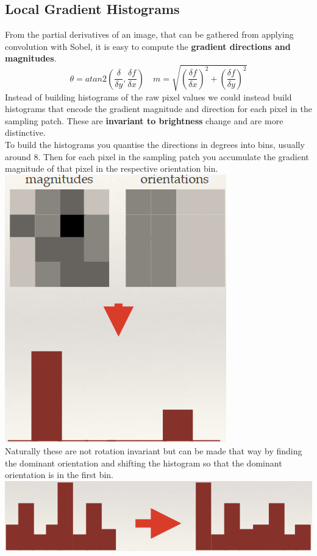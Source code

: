 \documentclass{article}
\begin{document}
	\subsection{Local Gradient Histograms}
	From the partial derivatives of an image, that can be gathered from applying convolution with Sobel, it is easy to compute the \textbf{gradient directions and magnitudes}.
	$$\theta=atan2(\frac{\delta }{\delta y},\frac{\delta f}{\delta x})\quad m=\sqrt{(\frac{\delta f}{\delta x})^2+(\frac{\delta f}{\delta y})^2}$$
	Instead of building histograms of the raw pixel values we could instead build histograms that encode the gradient magnitude and direction for each pixel in the sampling patch. These are \textbf{invariant to brightness} change and are more distinctive.\\
	To build the histograms you quantise the directions in degrees into bins, usually around 8. Then for each pixel in the sampling patch you accumulate the gradient magnitude of that pixel in the respective orientation bin.\\
	\includegraphics[width=0.4\linewidth]{gradient_histogram}\\
	Naturally these are not rotation invariant but can be made that way by finding the dominant orientation and shifting the histogram so that the dominant orientation is in the first bin.\\
	\includegraphics[width=\linewidth]{histogram_rotation}
\end{document}
